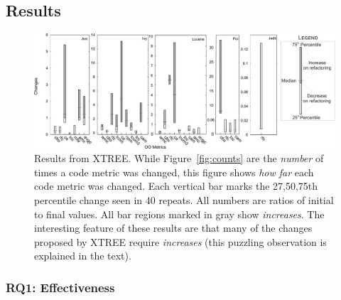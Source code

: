 \documentclass{sig-alternate}
\newcommand{\fig}[1]{Figure~\ref{fig:#1}}
\newcommand{\quart}[4]{\begin{picture}(80,4)%
{\color{black}\put(#3,2){\circle*{4}}\put(#1,2){\line(1,0){#2}}}\end{picture}}
\theoremstyle{break}
\begin{document}
\begin{itemize}


 
\subsection{Results}
 
 
\begin{figure}[!t]
\centering
\includegraphics[width=\linewidth]{figs/changes01.png}
\caption{Results  from XTREE.
While \fig{counts} are the {\em number} of times a code metric was changed,
this  figure shows {\em how far} each code metric was changed. Each vertical bar
marks the 27,50,75th percentile change seen in 40 repeats.
All numbers are ratios of initial to final values.
All bar regions marked in gray show {\em increases}.
The interesting feature of these results are that many
of the changes proposed by XTREE require {\em increases}
(this puzzling observation is explained in the text).}
\label{fig:changes}
\end{figure}

\subsubsection{RQ1: Effectiveness}


\end{itemize}
\end{document}
